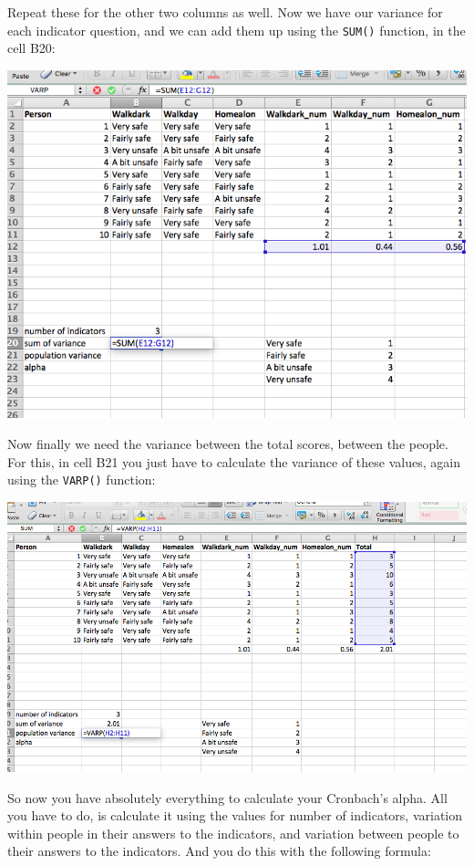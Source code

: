 \documentclass[
]{book}
\begin{document}
Repeat these for the other two columns as well. Now we have our variance for each indicator question, and we can add them up using the \texttt{SUM()} function, in the cell B20:

\includegraphics{imgs/sum_var_alpha.png}

Now finally we need the variance between the total scores, between the people. For this, in cell B21 you just have to calculate the variance of these values, again using the \texttt{VARP()} function:

\includegraphics{imgs/pop_var_alpha.png}

So now you have absolutely everything to calculate your Cronbach's alpha. All you have to do, is calculate it using the values for number of indicators, variation within people in their answers to the indicators, and variation between people to their answers to the indicators. And you do this with the following formula:
\end{document}
